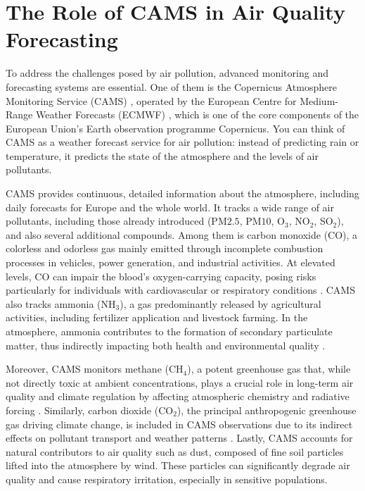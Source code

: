 \section{The Role of CAMS in Air Quality Forecasting}

To address the challenges posed by air pollution, advanced monitoring and forecasting systems are essential. 
One of them is the Copernicus Atmosphere Monitoring Service (CAMS) \cite{copernicusCopernicus}, operated by the European Centre for Medium-Range Weather Forecasts (ECMWF) \cite{ecmwfECMWF}, which is one of the core components of the European Union's Earth observation programme Copernicus. 
You can think of CAMS as a weather forecast service for air pollution: instead of predicting rain or temperature, it predicts the state of the atmosphere and the levels of air pollutants.

CAMS provides continuous, detailed information about the atmosphere, including daily forecasts for Europe and the whole world. It tracks a wide range of air pollutants, including those already introduced (PM${2.5}$, PM${10}$, O$_3$, NO$_2$, SO$_2$), and also several additional compounds.
Among them is carbon monoxide (CO), a colorless and odorless gas mainly emitted through incomplete combustion processes in vehicles, power generation, and industrial activities. At elevated levels, CO can impair the blood’s oxygen-carrying capacity, posing risks particularly for individuals with cardiovascular or respiratory conditions \cite{raub2000carbon}. CAMS also tracks ammonia (NH$_3$), a gas predominantly released by agricultural activities, including fertilizer application and livestock farming. In the atmosphere, ammonia contributes to the formation of secondary particulate matter, thus indirectly impacting both health and environmental quality \cite{wyer2022ammonia}.

Moreover, CAMS monitors methane (CH$_4$), a potent greenhouse gas that, while not directly toxic at ambient concentrations, plays a crucial role in long-term air quality and climate regulation by affecting atmospheric chemistry and radiative forcing \cite{lelieveld1993climate}. Similarly, carbon dioxide (CO$_2$), the principal anthropogenic greenhouse gas driving climate change, is included in CAMS observations due to its indirect effects on pollutant transport and weather patterns \cite{ebi2008climate}. Lastly, CAMS accounts for natural contributors to air quality such as dust, composed of fine soil particles lifted into the atmosphere by wind. These particles can significantly degrade air quality and cause respiratory irritation, especially in sensitive populations.

